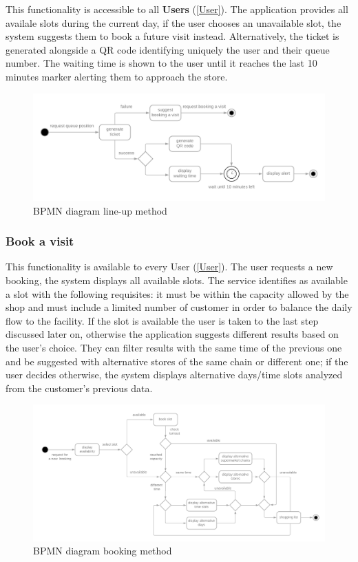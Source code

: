 \documentclass[table, 12pt]{article}
\begin{document}
This functionality is accessible to all \textbf{Users} (\ref{User}). The application provides all availale slots during the current day, if the user chooses an unavailable slot, the system suggests them to book a future visit instead.
Alternatively, the ticket is generated alongside a QR code identifying uniquely the user and their queue number. The waiting time is shown to the user until it reaches the last 10 minutes marker alerting them to approach the store.
\begin{figure}[!htb]
    \begin{center}
        \includegraphics[scale=0.29]{assets/function-line-up.png}
        \caption{BPMN diagram line-up method}
    \end{center}
\end{figure}

\subsubsection{Book a visit}
This functionality is available to every User (\ref{User}). The user requests a new booking, the system displays all available slots. The service identifies as available a slot with the following requisites: it must be within the capacity allowed by the shop and must include a limited number of customer in order to balance the daily flow to the facility. If the slot is available the user is taken to the last step discussed later on, otherwise the application suggests different results based on the user's choice. They can filter results with the same time of the previous one and be suggested with alternative stores of the same chain or different one; if the user decides otherwise, the system displays alternative days/time slots analyzed from the customer's previous data.

\begin{figure}[!htb]
    \begin{center}
        \includegraphics[scale=0.2]{assets/function-book-a-visit.png}
        \caption{BPMN diagram booking method}
    \end{center}
\end{figure}
\end{document}
